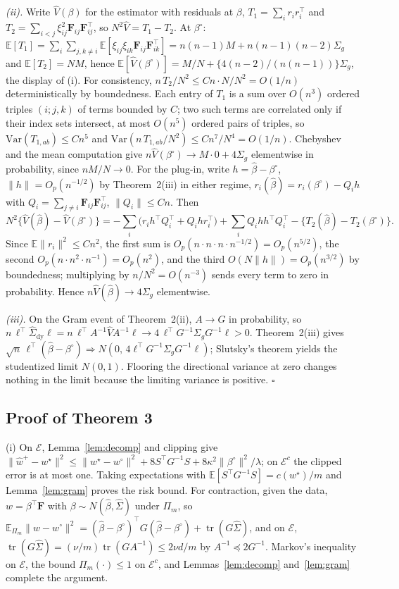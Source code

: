\documentclass[12pt]{article}
\newcommand{\E}{\mathbb{E}}
\newcommand{\tr}{\operatorname{tr}}
\newcommand{\norm}[1]{\|#1\|}
\newcommand{\wstar}{w^{\star}}
\newcommand{\wproj}{w^{\circ}}
\newcommand{\bproj}{\beta^{\circ}}
\newcommand{\whatp}{\hat w^{+}}
\newcommand{\bhat}{\hat\beta}
\newcommand{\Sighat}{\hat\Sigma}
\newcommand{\Fv}{\mathbf{F}}
\newcommand{\Var}{\mathrm{Var}}
\begin{document}
\emph{(ii).} Write $\hat V(\beta)$ for the estimator with residuals at $\beta$, $T_1=\sum_ir_ir_i^{\top}$ and $T_2=\sum_{i<j}\xi_{ij}^2\Fv_{ij}\Fv_{ij}^{\top}$, so $N^2\hat V=T_1-T_2$. At $\bproj$: $\E[T_1]=\sum_i\sum_{j,k\neq i}\E[\xi_{ij}\xi_{ik}\Fv_{ij}\Fv_{ik}^{\top}]=n(n-1)M+n(n-1)(n-2)\Sigma_g$ and $\E[T_2]=NM$, hence $\E[\hat V(\bproj)]=M/N+\{4(n-2)/(n(n-1))\}\Sigma_g$, the display of (i). For consistency, $n\,T_2/N^2\le Cn\cdot N/N^2=O(1/n)$ deterministically by boundedness. Each entry of $T_1$ is a sum over $O(n^3)$ ordered triples $(i;j,k)$ of terms bounded by $C$; two such terms are correlated only if their index sets intersect, at most $O(n^5)$ ordered pairs of triples, so $\Var(T_{1,ab})\le Cn^5$ and $\Var(n\,T_{1,ab}/N^2)\le Cn^7/N^4=O(1/n)$. Chebyshev and the mean computation give $n\hat V(\bproj)\to M\cdot0+4\Sigma_g$ elementwise in probability, since $nM/N\to0$. For the plug-in, write $h=\bhat-\bproj$, $\norm h=O_p(n^{-1/2})$ by Theorem~2(iii) in either regime, $r_i(\bhat)=r_i(\bproj)-Q_ih$ with $Q_i=\sum_{j\neq i}\Fv_{ij}\Fv_{ij}^{\top}$, $\norm{Q_i}\le C n$. Then
\[
N^2\{\hat V(\bhat)-\hat V(\bproj)\}=-\sum_i\big(r_ih^{\top}Q_i^{\top}+Q_ihr_i^{\top}\big)+\sum_iQ_ihh^{\top}Q_i^{\top}-\{T_2(\bhat)-T_2(\bproj)\}.
\]
Since $\E\norm{r_i}^2\le Cn^2$, the first sum is $O_p(n\cdot n\cdot n\cdot n^{-1/2})=O_p(n^{5/2})$, the second $O_p(n\cdot n^2\cdot n^{-1})=O_p(n^{2})$, and the third $O(N\norm h)=O_p(n^{3/2})$ by boundedness; multiplying by $n/N^2=O(n^{-3})$ sends every term to zero in probability. Hence $n\hat V(\bhat)\to4\Sigma_g$ elementwise.

\emph{(iii).} On the Gram event of Theorem~2(ii), $A\to G$ in probability, so $n\,\ell^{\top}\Sighat_{\mathrm{dy}}\ell=n\,\ell^{\top}A^{-1}\hat VA^{-1}\ell\to4\,\ell^{\top}G^{-1}\Sigma_gG^{-1}\ell>0$. Theorem~2(iii) gives $\sqrt n\,\ell^{\top}(\bhat-\bproj)\Rightarrow N(0,\,4\ell^{\top}G^{-1}\Sigma_gG^{-1}\ell)$; Slutsky's theorem yields the studentized limit $N(0,1)$. Flooring the directional variance at zero changes nothing in the limit because the limiting variance is positive. \hfill$\square$

\subsection*{Proof of Theorem 3}

(i) On $\mathcal{E}$, Lemma~\ref{lem:decomp} and clipping give $\norm{\whatp-\wstar}^2\le\norm{\wstar-\wproj}^2+8S^{\top}G^{-1}S+8\kappa^2\norm{\bproj}^2/\lambda$; on $\mathcal{E}^c$ the clipped error is at most one. Taking expectations with $\E[S^{\top}G^{-1}S]=c(\wstar)/m$ and Lemma~\ref{lem:gram} proves the risk bound. For contraction, given the data, $w=\beta^{\top}\Fv$ with $\beta\sim N(\bhat,\Sighat)$ under $\Pi_m$, so $\E_{\Pi_m}\norm{w-\wproj}^2=(\bhat-\bproj)^{\top}G(\bhat-\bproj)+\tr(G\Sighat)$, and on $\mathcal{E}$, $\tr(G\Sighat)=(\nu/m)\tr(GA^{-1})\le2\nu d/m$ by $A^{-1}\preceq2G^{-1}$. Markov's inequality on $\mathcal{E}$, the bound $\Pi_m(\cdot)\le1$ on $\mathcal{E}^c$, and Lemmas~\ref{lem:decomp} and~\ref{lem:gram} complete the argument.
\end{document}
